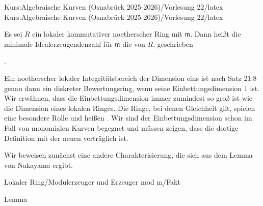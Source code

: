 Kurs:Algebraische Kurven (Osnabrück 2025-2026)/Vorlesung 22/latex
Kurs:Algebraische Kurven (Osnabrück 2025-2026)/Vorlesung 22/latex

\setcounter{section}{22}





{}

{


Es sei $R$ ein lokaler kommutativer noetherscher Ring mit
${\mathfrak m}$. Dann heißt die minimale Idealerzeugendenzahl für ${\mathfrak m}$ die  von $R$, geschrieben


 { . }


}


Ein noetherscher lokaler Integritätsbereich der Dimension eins
 {} {}
ist
nach Satz 21.8
genau dann ein diskreter Bewertungsring, wenn seine Einbettungsdimension $1$ ist. Wir erwähnen, dass die Einbettungsdimension immer zumindest so groß ist wie die Dimension eines lokalen Ringes. Die Ringe, bei denen Gleichheit gilt, spielen eine besondere Rolle und heißen  {.} Wir sind der Einbettungsdimension schon im Fall von monomialen Kurven begegnet und müssen zeigen, dass die dortige Definition
 {} {}
mit der neuen verträglich ist.


Wir beweisen zunächst eine andere Charakterisierung, die sich aus dem Lemma von Nakayama ergibt.



{Lokaler Ring/Modulerzeuger und Erzeuger mod m/Fakt}

{Lemma}

{}

{


\faktsituation {}



\faktzusatz {}

\faktzusatz {}


}

